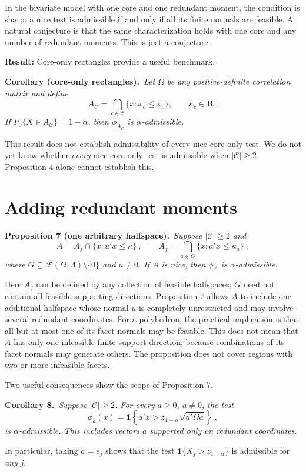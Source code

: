 \documentclass[11pt]{article}
\newcommand{\R}{\mathbf R}
\newcommand{\cC}{\mathcal C}
\newcommand{\cF}{\mathcal F}
\newcommand{\1}{\mathbf 1}
\newcommand{\result}[2]{%
  \par\medskip\noindent
  \begingroup\color{navy}\textbf{#1.}\endgroup\ \emph{#2}\par\smallskip}
\begin{document}
In the bivariate model with one core and one redundant moment, the condition
is sharp: a nice test is admissible if and only if all its finite normals are
feasible.  A natural conjecture is that the same characterization holds with
one core and any number of redundant moments. This is just a conjecture. 

{\bf Result:} Core-only rectangles provide a useful benchmark.  
\result{Corollary (core-only rectangles)}{Let $\Omega$ be any
positive-definite correlation matrix and define
\[
A_{\cC}
=
\bigcap_{c\in\cC}\{x:x_c\le\kappa_c\},
\qquad \kappa_c\in\R~.
\]
If $P_0\{X\in A_{\cC}\}=1-\alpha$, then $\phi_{A_{\cC}}$ is
$\alpha$-admissible.}
This result does not establish admissibility of every nice core-only test. We do not yet know whether \emph{every} nice core-only test is
admissible when $|\cC|\ge2$.  Proposition 4 alone cannot establish this.

\section{Adding redundant moments}

\result{Proposition 7 (one arbitrary halfspace)}{Suppose $|\cC|\ge2$ and
\[
A=A_f\cap\{x:u'x\le\kappa\}~,
\qquad
A_f=\bigcap_{a\in G}\{x:a'x\le\kappa_a\}~,
\]
where $G\subseteq\cF(\Omega,\Lambda)\setminus\{0\}$ and $u\ne0$.
If $A$ is nice, then $\phi_A$ is $\alpha$-admissible.}

Here \(A_f\) can be defined by any collection of feasible halfspaces; \(G\) need not contain all feasible supporting directions. Proposition 7 allows \(A\) to include one additional halfspace whose normal \(u\) is completely unrestricted and may involve several redundant coordinates. For a polyhedron, the practical implication is that all but at most one of its facet normals may be feasible. This does not mean that \(A\) has only one infeasible finite-support direction, because combinations of its facet normals may generate others. The proposition does not cover regions with two or more infeasible facets.

Two useful consequences show the scope of Proposition 7. 

\result{Corollary 8}{Suppose $|\cC|\ge2$. For every $a\ge0$, $a\ne0$, the
test
\[
\phi_a(x)
=
\1\left\{a'x>z_{1-\alpha}\sqrt{a'\Omega a}\right\}~,
\]
is $\alpha$-admissible. This includes vectors $a$ supported only on redundant
coordinates.}

In particular, taking \(a=e_j\) shows that the test \(\1\{X_j>z_{1-\alpha}\}\) is admissible for \emph{any} $j$.
\end{document}
